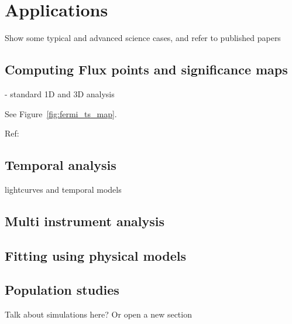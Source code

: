 \section{Applications}
\label{sec:applications}

Show some typical and advanced science cases, and refer to published papers

\subsection{Computing Flux points and significance maps}
\label{ssec:1D-3D-analysis}


- standard 1D and 3D analysis

See Figure~\ref{fig:fermi_ts_map}.


Ref:~\citep{Stewart2009}

\subsection{Temporal analysis}
\label{ssec:temporal-analysis}

lightcurves and temporal models

\subsection{Multi instrument analysis}
\label{ssec:multi-instrument-analysis}

\subsection{Fitting using physical models}
\label{ssec:naima-models-analysis}
\todo{}

\subsection{Population studies}
\label{ssec:population-studies}

Talk about simulations here? Or open a new section






